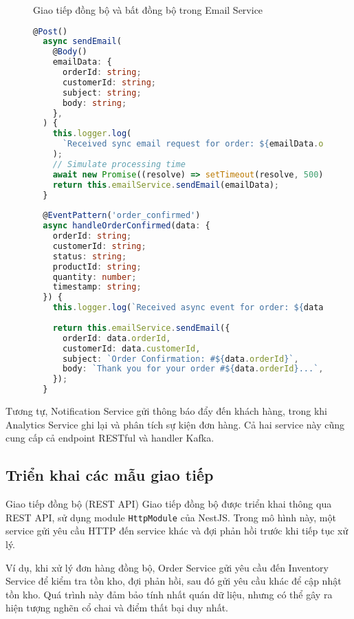\begin{figure}[H]{Giao tiếp đồng bộ và bất đồng bộ trong Email Service}
  \centering
  \begin{minipage}{\textwidth}
    \begin{lstlisting}[language=Typescript, basicstyle=\scriptsize\ttfamily]
  @Post()
  async sendEmail(
    @Body()
    emailData: {
      orderId: string;
      customerId: string;
      subject: string;
      body: string;
    },
  ) {
    this.logger.log(
      `Received sync email request for order: ${emailData.orderId}`,
    );
    // Simulate processing time
    await new Promise((resolve) => setTimeout(resolve, 500));
    return this.emailService.sendEmail(emailData);
  }
  
  @EventPattern('order_confirmed')
  async handleOrderConfirmed(data: {
    orderId: string;
    customerId: string;
    status: string;
    productId: string;
    quantity: number;
    timestamp: string;
  }) {
    this.logger.log(`Received async event for order: ${data.orderId}`);
  
    return this.emailService.sendEmail({
      orderId: data.orderId,
      customerId: data.customerId,
      subject: `Order Confirmation: #${data.orderId}`,
      body: `Thank you for your order #${data.orderId}...`,
    });
  }
  \end{lstlisting}
  \end{minipage}
\end{figure}

Tương tự, Notification Service gửi thông báo đẩy đến khách hàng, trong khi Analytics Service ghi lại và phân tích sự kiện đơn hàng. Cả hai service này cũng cung cấp cả endpoint RESTful và handler Kafka.

\subsection{Triển khai các mẫu giao tiếp}

Giao tiếp đồng bộ (REST API)
Giao tiếp đồng bộ được triển khai thông qua REST API, sử dụng module \texttt{HttpModule} của NestJS. Trong mô hình này, một service gửi yêu cầu HTTP đến service khác và đợi phản hồi trước khi tiếp tục xử lý.

Ví dụ, khi xử lý đơn hàng đồng bộ, Order Service gửi yêu cầu đến Inventory Service để kiểm tra tồn kho, đợi phản hồi, sau đó gửi yêu cầu khác để cập nhật tồn kho. Quá trình này đảm bảo tính nhất quán dữ liệu, nhưng có thể gây ra hiện tượng nghẽn cổ chai và điểm thất bại duy nhất.

